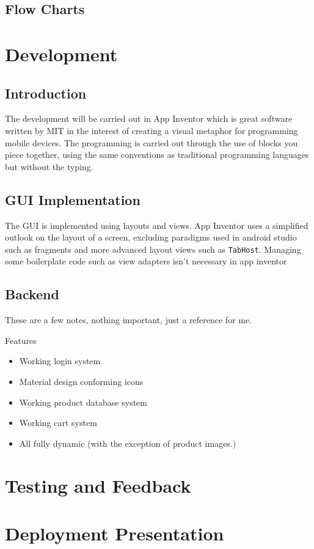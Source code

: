 \documentclass{scrreprt}
\begin{document}
\section{Flow Charts}

\chapter{Development}\label{development}

\section{Introduction}

The development will be carried out in App Inventor which is great software written by MIT in the interest of creating a visual metaphor for programming mobile devices. The programming is carried out through the use of blocks you piece together, using the same conventions as traditional programming languages but without the typing.

\section{GUI Implementation}

The GUI is implemented using layouts and views. App Inventor uses a simplified outlook on the layout of a screen, excluding paradigms used in android studio such as fragments and more advanced layout views such as \texttt{TabHost}. Managing some boilerplate code such as view adapters isn't necessary in app inventor 

\section{Backend}

These are a few notes, nothing important, just a reference for me.

Features

\begin{itemize}
    \item Working login system
    \item Material design conforming icons
    \item Working product database system
    \item Working cart system
    \item All fully dynamic (with the exception of product images.)
\end{itemize}

\chapter{Testing and Feedback}\label{testing}

\chapter{Deployment Presentation}\label{deployment}

\printbibliography
\end{document}
